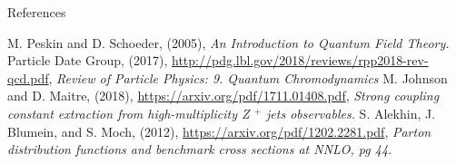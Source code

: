 \documentclass[14pt]{beamer}
\begin{document}
\begin{frame}[allowframebreaks]{References}

\begin{thebibliography}{99}
 M. Peskin and D. Schoeder, (2005), \textit{An Introduction to Quantum Field Theory.}
 Particle Date Group, (2017), \url{http://pdg.lbl.gov/2018/reviews/rpp2018-rev-qcd.pdf}, \textit{ Review of Particle Physics: 9. Quantum Chromodynamics}
M. Johnson and D. Maitre, (2018), \url{https://arxiv.org/pdf/1711.01408.pdf}, \textit{Strong coupling constant extraction from high-multiplicity Z ${^+}$ jets observables.}
 S. Alekhin, J. Blumein, and S. Moch, (2012), \url{https://arxiv.org/pdf/1202.2281.pdf}, \textit{Parton distribution functions and benchmark cross sections at NNLO, pg 44.} 

\end{thebibliography} 

\end{frame}
\end{document}

